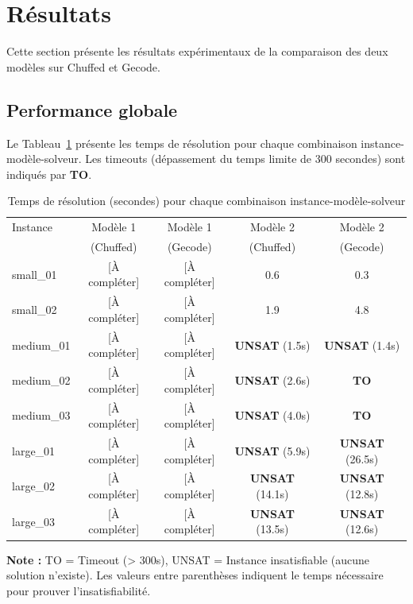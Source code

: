\section{Résultats}
\label{sec:resultats}

Cette section présente les résultats expérimentaux de la comparaison des deux modèles sur Chuffed et Gecode.

\subsection{Performance globale}

Le Tableau~\ref{tab:resultats_temps} présente les temps de résolution pour chaque combinaison instance-modèle-solveur. Les timeouts (dépassement du temps limite de 300 secondes) sont indiqués par \textbf{TO}.

\begin{table}[h]
\centering
\caption{Temps de résolution (secondes) pour chaque combinaison instance-modèle-solveur}
\label{tab:resultats_temps}
\begin{tabular}{lcccc}
\toprule
Instance & Modèle 1 & Modèle 1 & Modèle 2 & Modèle 2 \\
         & (Chuffed) & (Gecode) & (Chuffed) & (Gecode) \\
\midrule
small\_01 & [À compléter] & [À compléter] & 0.6 & 0.3 \\
small\_02 & [À compléter] & [À compléter] & 1.9 & 4.8 \\
medium\_01 & [À compléter] & [À compléter] & \textbf{UNSAT} (1.5s) & \textbf{UNSAT} (1.4s) \\
medium\_02 & [À compléter] & [À compléter] & \textbf{UNSAT} (2.6s) & \textbf{TO} \\
medium\_03 & [À compléter] & [À compléter] & \textbf{UNSAT} (4.0s) & \textbf{TO} \\
large\_01 & [À compléter] & [À compléter] & \textbf{UNSAT} (5.9s) & \textbf{UNSAT} (26.5s) \\
large\_02 & [À compléter] & [À compléter] & \textbf{UNSAT} (14.1s) & \textbf{UNSAT} (12.8s) \\
large\_03 & [À compléter] & [À compléter] & \textbf{UNSAT} (13.5s) & \textbf{UNSAT} (12.6s) \\
\bottomrule
\end{tabular}
\end{table}

\textbf{Note :} TO = Timeout (> 300s), UNSAT = Instance insatisfiable (aucune solution n'existe). Les valeurs entre parenthèses indiquent le temps nécessaire pour prouver l'insatisfiabilité.

